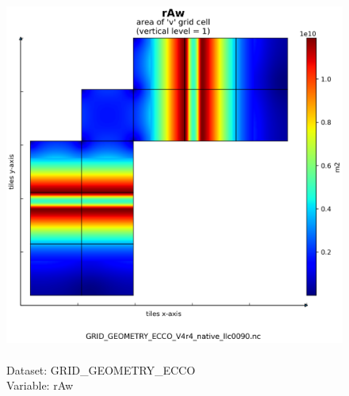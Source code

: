 \begin{figure}[H]
\centering
\includegraphics[scale=0.5]{../images/plots/native_plots_coords/Geometry_Parameters_for_the_Lat-Lon-Cap_90_(llc90)_Native_Model_Grid_(Version_4_Release_4)/rAw.png}
\caption{\\Dataset: GRID\_GEOMETRY\_ECCO\\Variable: rAw}
\label{tab:table-GRID_GEOMETRY_ECCO_rAw-Plot}
\end{figure}
\pagebreak
